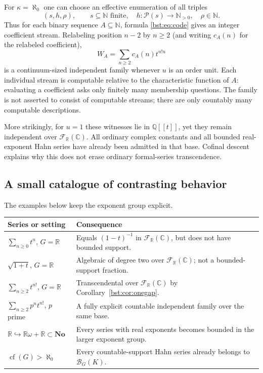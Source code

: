 \documentclass[11pt,letterpaper]{article}
\theoremstyle{definition}
\theoremstyle{remark}
\newcommand{\Q}{\mathbb Q}
\newcommand{\R}{\mathbb R}
\newcommand{\C}{\mathbb C}
\newcommand{\N}{\mathbb N}
\newcommand{\No}{\mathbf{No}}
\newcommand{\cof}{\operatorname{cf}}
\newcommand{\BB}[2]{\mathcal B_{#2}(#1)}
\newcommand{\FF}[2]{\mathcal F_{#2}(#1)}
\begin{document}
For $\kappa=\aleph_0$ one can choose an effective enumeration of all triples
\[
 (s,h,\rho),\qquad s\subseteq\N\text{ finite},\quad
 h:\mathcal P(s)\to\N_{>0},\quad\rho\in\N.
\]
Thus for each binary sequence $A\subseteq\N$, formula \eqref{bst:eq:code}
gives an integer coefficient stream. Relabeling position $n-2$ by $n\ge2$ (and writing $c_A(n)$ for the
relabeled coefficient),
\begin{equation}\label{bst:eq:integerfactorial}
 W_A=\sum_{n\ge2}c_A(n)t^{n!u}
\end{equation}
is a continuum-sized independent family whenever $u$ is an order unit.
Each individual stream is computable relative to the characteristic
function of $A$: evaluating a coefficient asks only finitely many membership
questions. The family is not asserted to consist of computable streams;
there are only countably many computable descriptions.

More strikingly, for $u=1$ these witnesses lie in $\Q[[t]]$, yet they remain
independent over $\FF{\C}{\R}$. All ordinary complex constants and all
bounded real-exponent Hahn series have already been admitted in that base.
Cofinal descent explains why this does not erase ordinary formal-series
transcendence.

\subsection{A small catalogue of contrasting behavior}

The examples below keep the exponent group explicit.

\begin{center}
\small
\begin{tabularx}{\textwidth}{@{}p{}X@{}}
\toprule
Series or setting & Consequence \\
\midrule
$\sum_{n\ge0}t^n$, $G=\R$ & Equals $(1-t)^{-1}$ in $\FF{\C}{\R}$, but does not have bounded support. \\
$\sqrt{1+t}$, $G=\R$ & Algebraic of degree two over $\FF{\C}{\R}$; not a bounded-support fraction. \\
$\sum_{n\ge2}t^{n!}$, $G=\R$ & Transcendental over $\FF{\C}{\R}$ by Corollary~\ref{bst:cor:onegap}. \\
$\sum_{n\ge2}p^n t^{n!}$, $p$ prime & A fully explicit countable independent family over the same base. \\
$\R\hookrightarrow \R\omega+\R\subset\No$ & Every series with real exponents becomes bounded in the larger exponent group. \\
$\cof(G)>\aleph_0$ & Every countable-support Hahn series already belongs to $\BB KG$. \\
\bottomrule
\end{tabularx}
\end{center}
\end{document}
